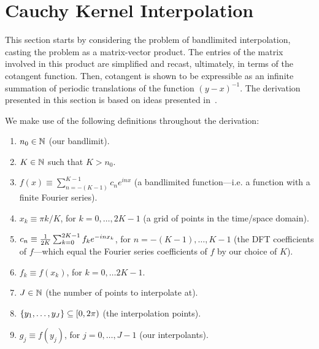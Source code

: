\section{Cauchy Kernel Interpolation}

This section starts by considering the problem of bandlimited
interpolation, casting the problem as a matrix-vector product. The
entries of the matrix involved in this product are simplified and
recast, ultimately, in terms of the cotangent function. Then,
cotangent is shown to be expressible as an infinite summation of
periodic translations of the function $(y - x)^{-1}$. The derivation
presented in this section is based on ideas presented
in~\cite{fmmfiltering}.

We make use of the following definitions throughout the derivation:
\begin{enumerate}
\item $n_0 \in \mathbb{N}$ (our bandlimit).
\item $K \in \mathbb{N}$ such that $K > n_0$.
\item $f(x) \equiv \sum_{n=-(K-1)}^{K-1} c_n e^{inx}$ (a
  bandlimited function\----i.e. a function with a finite
  Fourier series).
\item $x_k \equiv \pi k / K$, for $k = 0, \hdots, 2K - 1$ (a grid of
  points in the time/space domain).
\item $c_n \equiv {1 \over 2K} \sum_{k=0}^{2K-1} f_k e^{-inx_k}$, for
  $n = -(K - 1), \hdots, K - 1$ (the DFT coefficients of $f$\----which
  equal the Fourier series coefficients of $f$ by our choice of $K$).
\item $f_k \equiv f(x_k)$, for $k = 0, \hdots 2K - 1$.
\item $J \in \mathbb{N}$ (the number of points to interpolate at).
\item $\left\{y_1, \hdots, y_J\right\} \subseteq [0, 2\pi)$ (the interpolation points).
\item $g_j \equiv f(y_j)$, for $j = 0, \hdots, J - 1$ (our
  interpolants).
\end{enumerate}

